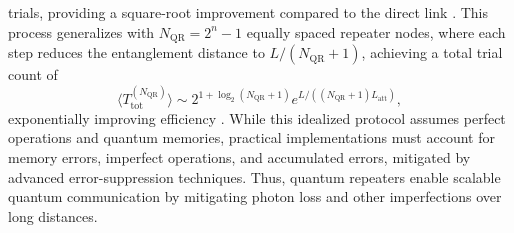 trials, providing a square-root improvement compared to the direct link \cite{Azuma:2023}.
 This process generalizes with $N_{\text{QR}} = 2^n - 1$ equally spaced repeater nodes, where each step reduces the entanglement distance to $L/(N_{\text{QR}} + 1)$,
 achieving a total trial count of
 \begin{equation}
    \langle T^{(N_{\text{QR}})}_{\text{tot}} \rangle \sim 2^{1+\log_2(N_{\text{QR}} + 1)} e^{L/((N_{\text{QR}} + 1)L_{\text{att}})},
 \end{equation}
 exponentially improving efficiency \cite{Azuma:2023}. While this idealized protocol assumes perfect operations and quantum memories, practical implementations must account for memory errors,
 imperfect operations, and accumulated errors, mitigated by advanced error-suppression techniques. Thus,
 quantum repeaters enable scalable quantum communication by mitigating photon loss and other imperfections over long distances.


